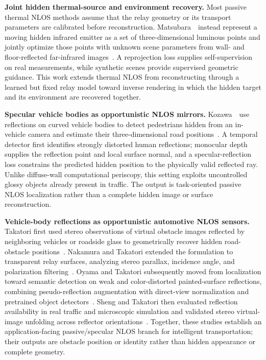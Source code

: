 \vspace{0.8mm}
\noindent \textbf{Joint hidden thermal-source and environment recovery.}
Most passive thermal NLOS methods assume that the relay geometry or its transport parameters are calibrated before reconstruction. Matsubara~\etal~instead represent a moving hidden infrared emitter as a set of three-dimensional luminous points and jointly optimize those points with unknown scene parameters from wall- and floor-reflected far-infrared images~\cite{matsubaraJointThermalNLOS2026}. A reprojection loss supplies self-supervision on real measurements, while synthetic scenes provide supervised geometric guidance. This work extends thermal NLOS from reconstructing through a learned but fixed relay model toward inverse rendering in which the hidden target and its environment are recovered together.

\vspace{0.8mm}
\noindent \textbf{Specular vehicle bodies as opportunistic NLOS mirrors.}
Kozawa~\etal~use reflections on curved vehicle bodies to detect pedestrians hidden from an in-vehicle camera and estimate their three-dimensional road positions~\cite{kozawaVehicleReflectionNLOS2026}. A temporal detector first identifies strongly distorted human reflections; monocular depth supplies the reflection point and local surface normal, and a specular-reflection loss constrains the predicted hidden position to the physically valid reflected ray. Unlike diffuse-wall computational periscopy, this setting exploits uncontrolled glossy objects already present in traffic. The output is task-oriented passive NLOS localization rather than a complete hidden image or surface reconstruction.

\vspace{0.8mm}
\noindent \textbf{Vehicle-body reflections as opportunistic automotive NLOS sensors.}
Takatori first used stereo observations of virtual obstacle images reflected by neighboring vehicles or roadside glass to geometrically recover hidden road-obstacle positions~\cite{takatoriReflectedImageNLOS2020}. Nakamura and Takatori extended the formulation to transparent relay surfaces, analyzing stereo parallax, incidence angle, and polarization filtering~\cite{nakamuraTransparentReflectionNLOS2022}. Oyama and Takatori subsequently moved from localization toward semantic detection on weak and color-distorted painted-surface reflections, combining pseudo-reflection augmentation with direct-view normalization and pretrained object detectors~\cite{oyamaPaintedReflectionDetection2025}. Sheng and Takatori then evaluated reflection availability in real traffic and microscopic simulation and validated stereo virtual-image unfolding across reflector orientations~\cite{shengVehicleReflectionObstacle2026}. Together, these studies establish an application-facing passive/specular NLOS branch for intelligent transportation; their outputs are obstacle position or identity rather than hidden appearance or complete geometry.


